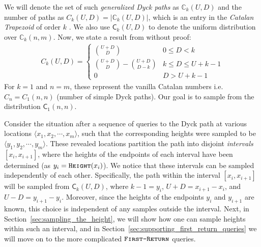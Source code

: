 We will denote the set of such \emph{generalized Dyck paths} as $\mathbb C_k(U,D)$ and the number of paths as $C_k(U,D) = |\mathbb C_k(U,D)|$,
which is an entry in the \textit{Catalan Trapezoid} of order $k$ \cite{trap}.
We also use $\mathsf C_k(U,D)$ to denote the uniform distribution over $\mathbb C_k(n,m)$.
Now, we state a result from \cite{trap} without proof:
\begin{align}
    \label{eq:catalan_trapezoid}
    C_k(U,D)=
    \begin{cases}
    \binom{U+D}{D} &0\le D<k\\
    \binom{U+D}{D} - \binom{U+D}{D-k} &k\le D\le U+k-1\\
    0 &D>U+k-1
    \end{cases}
\end{align}
For $k = 1$ and $n=m$, these represent the vanilla Catalan numbers i.e. $C_n = C_1(n,n)$ (number of simple Dyck paths).
Our goal is to sample from the distribution $\mathsf C_1(n,n)$.

Consider the situation after a sequence of  queries to the Dyck path at various locations $\langle x_1, x_2,\cdots, x_m \rangle$,
such that the corresponding heights were sampled to be $ \langle y_1, y_2,\cdots, y_m \rangle$.
These revealed locations partition the path into disjoint \emph{intervals} $[x_i,x_{i+1}]$,
where the heights of the endpoints of each interval have been determined (as $y_i = \texttt{\textsc{Height}}(x_i)$).
We notice that these intervals can be sampled independently of each other.
Specifically, the path within the interval $[x_i, x_{i+1}]$ will be sampled from $\mathsf C_k(U,D)$,
where $k - 1 = y_i$, $U + D = x_{i+1} - x_i$, and $U-D = y_{i+1} - y_i$.
Moreover, since the heights of the endpoints $y_i$ and $y_{i+1}$ are known, this choice is independent of any samples outside the interval.
Next, in Section~\ref{sec:sampling_the_height}, we will show how one can sample heights within such an interval,
and in Section~\ref{sec:supporting_first_return_queries} we will move on to the more complicated $\texttt{\textsc{First-Return}}$ queries.




